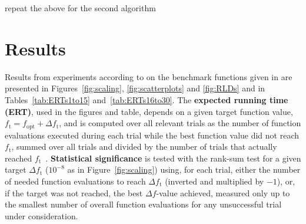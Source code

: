 \documentclass[conference]{IEEEtran}
\newcommand{\Df}{\ensuremath{\Delta f}}
\newcommand{\fopt}{\ensuremath{f_\mathrm{opt}}}
\newcommand{\ftarget}{\ensuremath{f_\mathrm{t}}}
\newcommand{\change}[1]{{\color{red} #1}}
\begin{document}
\change{repeat the above for the second algorithm}

\section{Results}

Results from experiments according to \cite{hansen2012exp} on the benchmark
functions given in \cite{wp200902_2010,hansen2012noi} are presented in
Figures~\ref{fig:scaling}, \ref{fig:scatterplots} and \ref{fig:RLDs} and
in Tables~\ref{tab:ERTs1to15} and~\ref{tab:ERTs16to30}. The \textbf{expected running time (ERT)}, used in the figures and table, depends on a
given target function value, $\ftarget=\fopt+\Delta\ftarget$, and is computed over all relevant trials
as the number of function evaluations executed during each trial while the best
function value did not reach \ftarget, summed over all trials
and divided by the number of trials that actually reached \ftarget\
\cite{hansen2012exp,price1997dev}. 
\textbf{Statistical significance} is tested with the rank-sum test for a given
target $\Delta\ftarget$ ($10^{-8}$ as in Figure~\ref{fig:scaling}) using,
for each trial, either the number of needed function evaluations to reach
$\Delta\ftarget$ (inverted and multiplied by $-1$), or, if the target was not
reached, the best $\Df$-value achieved, measured only up to the smallest number
of overall function evaluations for any unsuccessful trial under consideration. 


\end{document}
